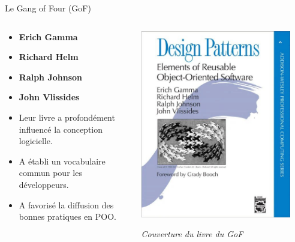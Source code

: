 \documentclass[aspectratio=169]{beamer}
\begin{document}
  \begin{frame}{Le Gang of Four (GoF)}
    \begin{columns}
      \begin{column}{0.6\textwidth}
        \begin{itemize}
          \item \textbf{Erich Gamma}
          \item \textbf{Richard Helm}
          \item \textbf{Ralph Johnson}
          \item \textbf{John Vlissides}
        \end{itemize}
        \pause
        \begin{itemize}
          \item Leur livre a profondément influencé la conception logicielle.
          \item A établi un vocabulaire commun pour les développeurs.
          \item A favorisé la diffusion des bonnes pratiques en POO.
        \end{itemize}
      \end{column}
      \begin{column}{0.4\textwidth}
        \includegraphics[width=0.9\textwidth]{pic/gof_book.jpg}
        \begin{center}
          \small{\textit{Couverture du livre du GoF}}
        \end{center}
      \end{column}
    \end{columns}
  \end{frame}
\end{document}
